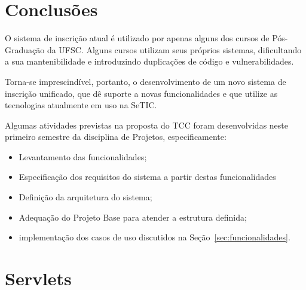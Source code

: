 \documentclass[
  10.5pt,				  %
	openright,			%
	twoside,			  %
  a5paper,
  chapter=TITLE,	%
	section=TITLE,	%
  hyphens,        %
	english,        %
	brazil          %
]{abntex2}
\begin{document}
\chapter{Conclusões}

O sistema de inscrição atual é utilizado por apenas alguns dos cursos de Pós-Graduação da UFSC. Alguns cursos utilizam seus próprios sistemas, dificultando a sua mantenibilidade e introduzindo duplicações de código e vulnerabilidades.

Torna-se imprescindível, portanto, o desenvolvimento de um novo sistema de inscrição unificado, que dê suporte a novas funcionalidades e que utilize as tecnologias atualmente em uso na SeTIC.

Algumas atividades previstas na proposta do TCC foram desenvolvidas neste primeiro semestre da disciplina de Projetos, especificamente:
\begin{itemize}
  \item Levantamento das funcionalidades;
  \item Especificação dos requisitos do sistema a partir destas funcionalidades
  \item Definição da arquitetura do sistema;
  \item Adequação do Projeto Base para atender a estrutura definida;
  \item implementação dos casos de uso discutidos na Seção~\ref{sec:funcionalidades}.
\end{itemize}





%








\anexos

\chapter{Servlets}\label{anexo:servlets}
\end{document}
